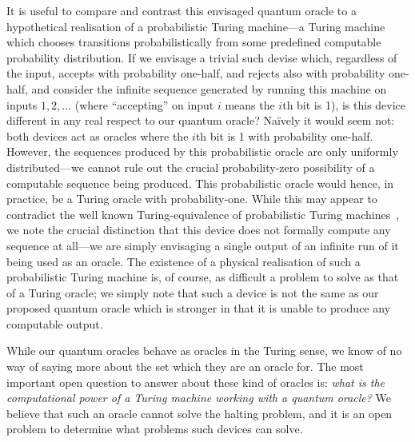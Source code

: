 \documentclass{comjnl}
\begin{document}
It is useful to compare and contrast this envisaged quantum oracle to a hypothetical realisation of a probabilistic Turing machine---a Turing machine which chooses transitions probabilistically from some predefined computable probability distribution.
If we envisage a trivial such devise which, regardless of the input, accepts with probability one-half, and rejects also with probability one-half, and consider the infinite sequence generated by running this machine on inputs $1,2,\dots$ (where ``accepting'' on input $i$ means the $i$th bit is 1), is this device different in any real respect to our quantum oracle?
Na\"ively it would seem not: both devices act as oracles where the $i$th bit is 1 with probability one-half.
However, the sequences produced by this probabilistic oracle are only uniformly distributed---we cannot rule out the crucial probability-zero possibility of a computable sequence being produced.
This probabilistic oracle would hence, in practice, be a Turing oracle with probability-one.
While this may appear to contradict the well known Turing-equivalence of probabilistic Turing machines~\cite{de-Leeuw:1956aa}, we note the crucial distinction that this device does not formally compute any sequence at all---we are simply envisaging a single output of an infinite run of it being used as an oracle.
The existence of a physical realisation of such a probabilistic Turing machine is, of course, as difficult a problem to solve as that of a Turing oracle; we simply note that such a device is not the same as our proposed quantum oracle which is stronger in that it is unable to produce any computable output.

While our quantum oracles behave as oracles in the Turing sense, we know of no way of saying more about the set which they are an oracle for.
The most important open question to answer about these kind of oracles is: \emph{what is the computational power of a Turing machine working with a quantum oracle?}
We believe that such an oracle cannot solve the halting problem, and it is an open problem to determine what problems such devices can solve.
\end{document}

